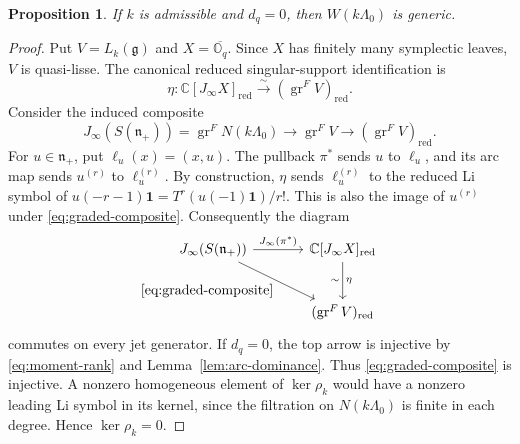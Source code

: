 \documentclass[11pt]{amsart}
\newtheorem{proposition}[theorem]{Proposition}
\theoremstyle{definition}
\theoremstyle{remark}
\newtheorem{remark}[theorem]{Remark}
\newcommand{\C}{\mathbb C}
\newcommand{\g}{\mathfrak g}
\newcommand{\n}{\mathfrak n_+}
\newcommand{\vac}{\mathbf1}
\newcommand{\J}{J_\infty}
\DeclareMathOperator{\gr}{gr}
\begin{document}
\begin{proposition}\label{prop:genericity}
If $k$ is admissible and $d_q=0$, then $W(k\Lambda_0)$ is generic.
\end{proposition}
\begin{proof}
Put $V=L_k(\g)$ and $X=\overline{\mathbb O_q}$.
Since $X$ has finitely many symplectic leaves, $V$ is quasi-lisse.
The canonical reduced singular-support identification
\cite[Theorem~9.2]{AMArc} is
\[
 \eta:\C[J_\infty X]_{\mathrm{red}}
 \xrightarrow{\sim}(\gr^F V)_{\mathrm{red}}.
\]
Consider the induced composite
\begin{equation}\label{eq:graded-composite}
 \J(S(\n))=\gr^F N(k\Lambda_0)
 \longrightarrow\gr^F V
 \longrightarrow(\gr^F V)_{\mathrm{red}}.
\end{equation}
For $u\in\n$, put $\ell_u(x)=(x,u)$. The pullback $\pi^*$ sends
$u$ to $\ell_u$, and its arc map sends $u^{(r)}$ to $\ell_u^{(r)}$.
By construction, $\eta$ sends $\ell_u^{(r)}$ to the reduced Li symbol of
$u(-r-1)\vac=T^r(u(-1)\vac)/r!$. This is also the image of $u^{(r)}$
under \eqref{eq:graded-composite}. Consequently the diagram
\[
\begin{tikzcd}[column sep=large,row sep=large]
 \J(S(\n))\arrow[r,"\J(\pi^*)"]
 \arrow[dr,"\eqref{eq:graded-composite}"']&
 \C[J_\infty X]_{\mathrm{red}}\arrow[d,"\eta","\sim"']\\
 &(\gr^F V)_{\mathrm{red}}
\end{tikzcd}
\]
commutes on every jet generator. If $d_q=0$, the top arrow is injective
by \eqref{eq:moment-rank} and Lemma~\ref{lem:arc-dominance}.
Thus \eqref{eq:graded-composite} is injective. A nonzero homogeneous
element of $\ker\rho_k$ would have a nonzero leading Li symbol in its
kernel, since the filtration on $N(k\Lambda_0)$ is finite in each degree.
Hence $\ker\rho_k=0$.
\end{proof}

\end{document}
